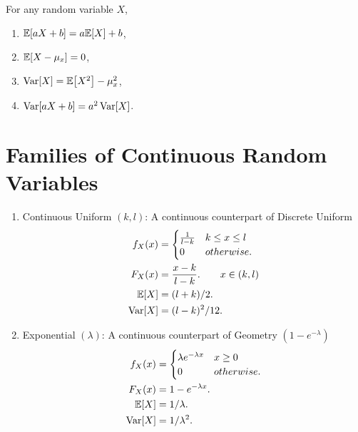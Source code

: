 \begin{theorem}
    For any random variable $X$,
    \begin{enumerate}
        \item $\E{aX+b}=a\E{X}+b$,
        \item $\E{X-\mu_x}=0$,
        \item $\Var[X] = \E{X^2}-\mu_x^2$,
        \item $\mathop{\mathrm{Var}}\nolimits[aX+b]=a^2\mathop{\mathrm{Var}}\nolimits[X]$.
    \end{enumerate}
\end{theorem}

\section{Families of Continuous Random Variables}
\begin{enumerate}
    \item Continuous Uniform $(k,l)$: A continuous counterpart of Discrete Uniform {
        \begin{align*}
            f_X(x)
            &= {
                \begin{cases}
                \frac{1}{l-k} & k\leq x \leq l \\
                0             & otherwise.
                \end{cases} } \\
            F_X(x)
            &= \frac{x-k}{l-k}. \qquad x\in (k,l)\\
            \E{X}
            &= (l+k)/2. \\
            \Var[X]
            &= (l-k)^2/12. \\
        \end{align*}
    }
    \item Exponential $(\lambda)$: A continuous counterpart of Geometry $(1-e^{-\lambda})$ {
        \begin{align*}
            f_X(x)
            &= {
                \begin{cases}
                    \lambda e^{-\lambda x} & x\geq 0 \\
                    0                      & otherwise.
                \end{cases}
            } \\
            F_X(x)
            &= 1-e^{-\lambda x}. \\
            \E{X}
            &= 1/\lambda. \\
            \Var[X]
            &= 1/\lambda^2.
        \end{align*}
}
\end{enumerate}
